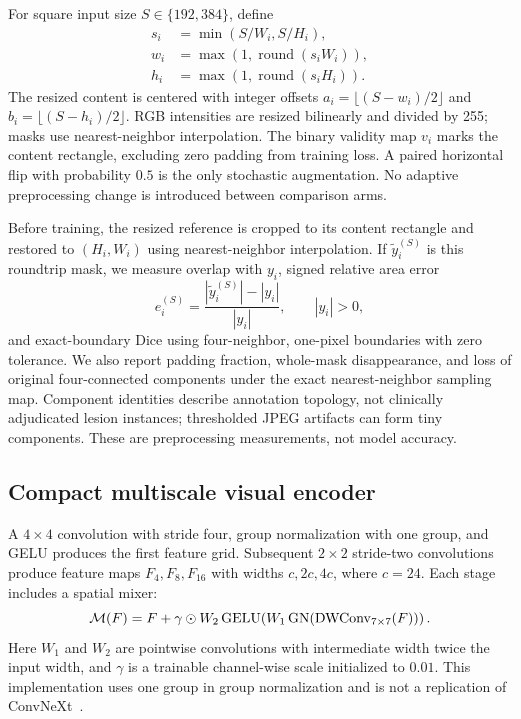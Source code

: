 For square input size $S\in\{192,384\}$, define
\begin{align}
 s_i&=\min(S/W_i,S/H_i),\\
 w_i&=\max(1,\operatorname{round}(s_iW_i)),\\
 h_i&=\max(1,\operatorname{round}(s_iH_i)).
\end{align}
The resized content is centered with integer offsets $a_i=\lfloor(S-w_i)/2\rfloor$ and $b_i=\lfloor(S-h_i)/2\rfloor$. RGB intensities are resized bilinearly and divided by 255; masks use nearest-neighbor interpolation. The binary validity map $v_i$ marks the content rectangle, excluding zero padding from training loss. A paired horizontal flip with probability $0.5$ is the only stochastic augmentation. No adaptive preprocessing change is introduced between comparison arms.

Before training, the resized reference is cropped to its content rectangle and restored to $(H_i,W_i)$ using nearest-neighbor interpolation. If $\widetilde y_i^{(S)}$ is this roundtrip mask, we measure overlap with $y_i$, signed relative area error
\begin{equation}
 e_i^{(S)}=\frac{|\widetilde y_i^{(S)}|-|y_i|}{|y_i|},\qquad |y_i|>0,
\end{equation}
and exact-boundary Dice using four-neighbor, one-pixel boundaries with zero tolerance. We also report padding fraction, whole-mask disappearance, and loss of original four-connected components under the exact nearest-neighbor sampling map. Component identities describe annotation topology, not clinically adjudicated lesion instances; thresholded JPEG artifacts can form tiny components. These are preprocessing measurements, not model accuracy.

\subsection{Compact multiscale visual encoder}
A $4\times4$ convolution with stride four, group normalization with one group, and GELU produces the first feature grid. Subsequent $2\times2$ stride-two convolutions produce feature maps $F_4,F_8,F_{16}$ with widths $c,2c,4c$, where $c=24$. Each stage includes a spatial mixer:
\begin{equation}
 \mathcal M(F)=F+\gamma\odot
 W_2\operatorname{GELU}\!\left(W_1\operatorname{GN}(\operatorname{DWConv}_{7\times7}(F))\right).
\end{equation}
Here $W_1$ and $W_2$ are pointwise convolutions with intermediate width twice the input width, and $\gamma$ is a trainable channel-wise scale initialized to $0.01$. This implementation uses one group in group normalization and is not a replication of ConvNeXt~\cite{liu2022}.

